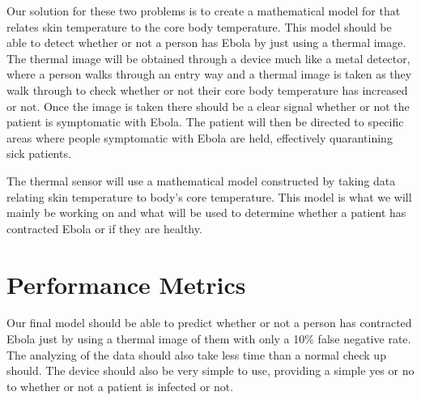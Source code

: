 \documentclass{article}
\begin{document}
Our solution for these two problems is to create a mathematical model for that relates skin temperature to the core body temperature. This model should be able to detect whether or not a person has Ebola by just using a thermal image. The thermal image will be obtained through a device much like a metal detector, where a person walks through an entry way and a thermal image is taken as they walk through to check whether or not their core body temperature has increased or not. Once the image is taken there should be a clear signal whether or not the patient is symptomatic with Ebola. The patient will then be directed to specific areas where people symptomatic with Ebola are held, effectively quarantining sick patients.

The thermal sensor will use a mathematical model constructed by taking data relating skin temperature to body's core temperature. This model is what we will mainly be working on and what will be used to determine whether a patient has contracted Ebola or if they are healthy.

\section{Performance Metrics}
Our final model should be able to predict whether or not a person has contracted Ebola just by using a thermal image of them with only a 10\% false negative rate. The analyzing of the data should also take less time than a normal check up should. The device should also be very simple to use, providing a simple yes or no to whether or not a patient is infected or not.
\end{document}
